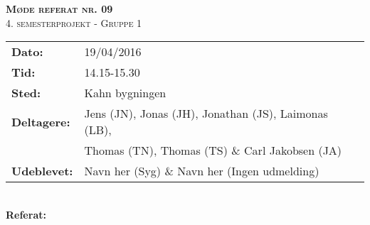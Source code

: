 
\newcommand{\HRule}{\rule{\linewidth}{0.1mm}}


	\begin{center}
		{\huge \bfseries \textsc{Møde referat nr. 09}}\\
		\textsc{\large 4. semesterprojekt - Gruppe 1}\\[0.3cm]
	\end{center}
	\begin{tabular}{ll}
	\large \textbf{Dato:} & 19/04/2016  \\ %
	\large \textbf{Tid:}  & 14.15-15.30 \\ %
	\large \textbf{Sted:} & Kahn bygningen	\\ %
	\large \textbf{Deltagere:} & Jens (JN), Jonas (JH), Jonathan (JS), Laimonas (LB), \\
	\large \textbf & Thomas (TN),  Thomas (TS) \& Carl Jakobsen (JA)\\
	\large \textbf{Udeblevet:} & Navn her (Syg) \& Navn her (Ingen udmelding)	\\
	\end{tabular}\\
	\phantom{\,}\hspace{0.1em} \large \textbf{Referat:}
